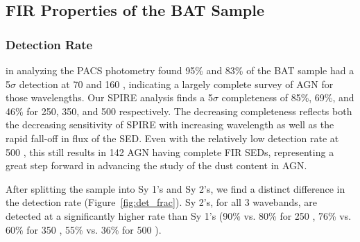 \subsection{FIR Properties of the BAT Sample }
\subsubsection{Detection Rate}
\citet{Melendez:2014yu} in analyzing the PACS photometry found 95\% and 83\% of the BAT sample had a 5$\sigma$ detection at 70 and 160 \micron, indicating a largely complete survey of AGN for those wavelengths. Our SPIRE analysis finds a 5$\sigma$ completeness of 85\%, 69\%, and 46\% for 250, 350, and 500 \micron{} respectively. The decreasing completeness reflects both the decreasing sensitivity of SPIRE with increasing wavelength as well as the rapid fall-off in flux of the SED. Even with the relatively low detection rate at 500 \micron{}, this still results in 142 AGN having complete FIR SEDs, representing a great step forward in advancing the study of the dust content in AGN. 

After splitting the sample into Sy 1's and Sy 2's, we find a distinct difference in the detection rate (Figure~\ref{fig:det_frac}). Sy 2's, for all 3 wavebands, are detected at a significantly higher rate than Sy 1's (90\% vs. 80\% for 250 \um, 76\% vs. 60\% for 350 \um, 55\% vs. 36\% for 500 \um).